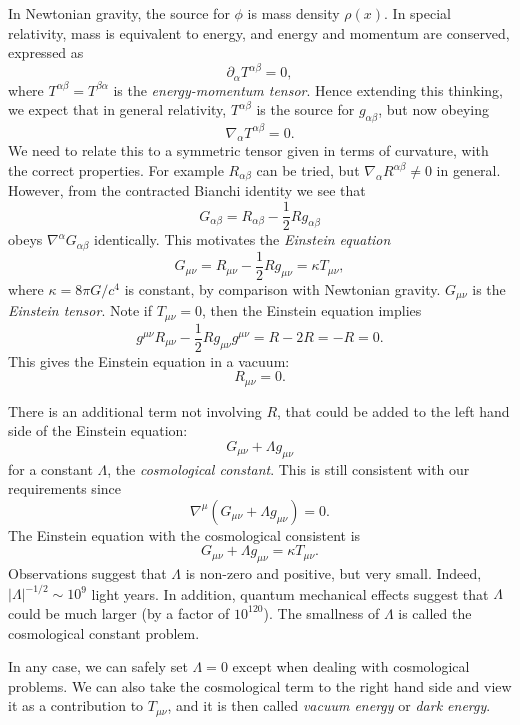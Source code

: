 \documentclass[12pt]{article}
\begin{document}
In Newtonian gravity, the source for $\phi$ is mass density $\rho(x)$. In special relativity, mass is equivalent to energy, and energy and momentum are conserved, expressed as
\[
\partial_\alpha T^{\alpha\beta} = 0,
\]
where $T^{\alpha\beta} = T^{\beta\alpha}$ is the \emph{energy-momentum tensor}. Hence extending this thinking, we expect that in general relativity, $T^{\alpha\beta}$ is the source for $g_{\alpha\beta}$, but now obeying
\[
\nabla_\alpha T^{\alpha\beta} = 0.
\]
We need to relate this to a symmetric tensor given in terms of curvature, with the correct properties. For example $R_{\alpha\beta}$ can be tried, but $\nabla_\alpha R^{\alpha\beta} \neq 0$ in general. However, from the contracted Bianchi identity we see that
\[
G_{\alpha\beta} = R_{\alpha\beta} - \frac{1}{2} R g_{\alpha\beta}
\]
obeys $\nabla^\alpha G_{\alpha\beta}$ identically. This motivates the \emph{Einstein equation}
\[
G_{\mu\nu} = R_{\mu\nu} - \frac{1}{2} Rg_{\mu\nu} = \kappa T_{\mu\nu},
\]
where $\kappa = 8\pi G/c^4$ is constant, by comparison with Newtonian gravity. $G_{\mu\nu}$ is the \emph{Einstein tensor}. Note if $T_{\mu\nu} = 0$, then the Einstein equation implies
\[
g^{\mu\nu} R_{\mu\nu} - \frac{1}{2} R g_{\mu\nu} g^{\mu\nu} = R - 2R = -R = 0.
\]
This gives the Einstein equation in a vacuum:
\[
R_{\mu\nu} = 0.
\]

There is an additional term not involving $R$, that could be added to the left hand side of the Einstein equation:
\[
G_{\mu\nu} + \Lambda g_{\mu\nu}
\]
for a constant $\Lambda$, the \emph{cosmological constant}. This is still consistent with our requirements since
\[
\nabla^\mu (G_{\mu\nu} + \Lambda g_{\mu\nu}) = 0.
\]
The Einstein equation with the cosmological consistent is
\[
G_{\mu\nu} + \Lambda g_{\mu\nu} = \kappa T_{\mu\nu}.
\]
Observations suggest that $\Lambda$ is non-zero and positive, but very small. Indeed, $|\Lambda|^{-1/2} \sim 10^9$ light years. In addition, quantum mechanical effects suggest that $\Lambda$ could be much larger (by a factor of $10^{120}$). The smallness of $\Lambda$ is called the cosmological constant problem.

In any case, we can safely set $\Lambda = 0$ except when dealing with cosmological problems. We can also take the cosmological term to the right hand side and view it as a contribution to $T_{\mu\nu}$, and it is then called \emph{vacuum energy} or \emph{dark energy}.
\end{document}
